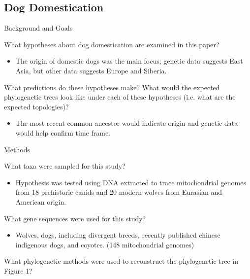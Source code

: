 \documentclass[12pt,a4paper]{article}
\begin{document}
\subsection{Dog Domestication}
\begin{itemize}
    \item Background and Goals
        \begin{itemize}
            {\color{darklc} \item What hypotheses about dog domestication are examined in this paper?}
                \begin{itemize}
                    \item The origin of domestic dogs was the main focus; genetic data suggests East Asia, but other data suggests Europe and Siberia. 
                \end{itemize}
            {\color{darklc} \item  What predictions do these hypotheses make? What would the expected phylogenetic trees look like under each of these hypotheses (i.e. what are the expected topologies)?}
                \begin{itemize}
                    \item The most recent common ancestor would indicate origin and genetic data would help confirm time frame.
                \end{itemize}
        \end{itemize}
    \item Methods
        \begin{itemize}
            {\color{darklc} \item  What taxa were sampled for this study?} 
                \begin{itemize}
                    \item Hypothesis was tested using DNA extracted to trace mitochondrial genomes from 18 prehistoric canids and 20 modern wolves from Eurasian and American origin. 
                \end{itemize}
            {\color{darklc} \item  What gene sequences were used for this study?}
                \begin{itemize}
                    \item Wolves, dogs, including divergent breeds, recently published chinese indigenous dogs, and coyotes. (148 mitochondrial genomes)
                \end{itemize}
            {\color{darklc} \item  What phylogenetic methods were used to reconstruct the phylogenetic tree in Figure 1?}

\end{itemize}
\end{itemize}
\end{document}
